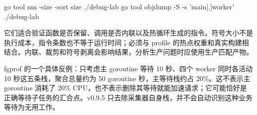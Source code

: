 \documentclass[UTF8,fontset=fandol,openany,11pt]{ctexbook}
\begin{document}
\begin{codeblock}
go tool nm -size -sort size ./debug-lab
go tool objdump -S -s 'main[.]worker' ./debug-lab
\end{codeblock}

它们适合验证函数是否保留、调用是否内联以及热循环生成的指令。符号大小不是执行成本，指令条数也不等于运行时间；必须与 profile 的热点权重和真实构建相结合。内联、裁剪和符号剥离会影响结果，分析生产问题时应使用生产匹配产物。\cite{tools-nm}\cite{tools-objdump}

fgprof 的一个具体反例：只考虑主 goroutine 等待 10 秒、四个 worker 同时各活动 10 秒这五条栈，聚合总量约为 50 goroutine 秒，主等待栈约占 20\%。这不表示主 goroutine 消耗了 20\% CPU，也不表示删除其等待就能加速请求；它可能恰好是正确等待子任务的汇合点。v0.9.5 只去除采集器自身栈，并不会自动识别这种业务等待为无用工作。\cite{tools-fgprof-source}
\end{document}
